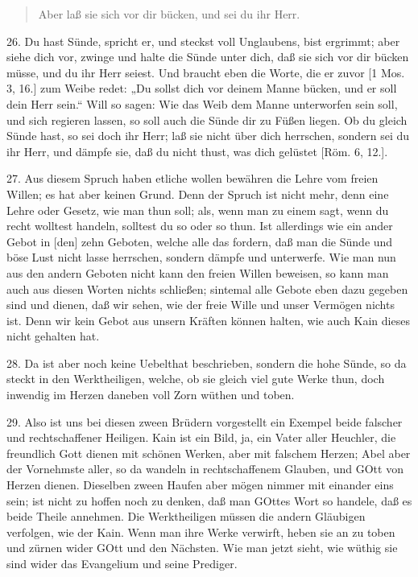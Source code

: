 \begin{quote}
Aber laß sie sich vor dir bücken, und sei du ihr Herr.
\end{quote}

26. Du hast Sünde, spricht er, und steckst voll Unglaubens, bist ergrimmt; aber siehe dich vor, zwinge und halte die Sünde unter dich, daß sie sich vor dir bücken müsse, und du ihr Herr seiest. Und braucht eben die Worte, die er zuvor [1 Mos. 3, 16.] zum Weibe redet: „Du sollst dich vor deinem Manne bücken, und er soll dein Herr sein.“ Will so sagen: Wie das Weib dem Manne unterworfen sein soll, und sich regieren lassen, so soll auch die Sünde dir zu Füßen liegen. Ob du gleich Sünde hast, so sei doch ihr Herr; laß sie nicht über dich herrschen, sondern sei du ihr Herr, und dämpfe sie, daß du nicht thust, was dich gelüstet [Röm. 6, 12.].

27. Aus diesem Spruch haben etliche wollen bewähren die Lehre vom freien Willen; es hat aber keinen Grund. Denn der Spruch ist nicht mehr, denn eine Lehre oder Gesetz, wie man thun soll; als, wenn man zu einem sagt, wenn du recht wolltest handeln, solltest du so oder so thun. Ist allerdings wie ein ander Gebot in [den] zehn Geboten, welche alle das fordern, daß man die Sünde und böse Lust nicht lasse herrschen, sondern dämpfe und unterwerfe. Wie man nun aus den andern Geboten nicht kann den freien Willen beweisen, so kann man auch aus diesen Worten nichts schließen; sintemal alle Gebote eben dazu gegeben sind und dienen, daß wir sehen, wie der freie Wille und unser Vermögen nichts ist. Denn wir kein Gebot aus unsern Kräften können halten, wie auch Kain dieses nicht gehalten hat.

28. Da ist aber noch keine Uebelthat beschrieben, sondern die hohe Sünde, so da steckt in den Werktheiligen, welche, ob sie gleich viel gute Werke thun, doch inwendig im Herzen daneben voll Zorn wüthen und toben.

29. Also ist uns bei diesen zween Brüdern vorgestellt ein Exempel beide falscher und rechtschaffener Heiligen. Kain ist ein Bild, ja, ein Vater aller Heuchler, die freundlich Gott dienen mit schönen Werken, aber mit falschem Herzen; Abel aber der Vornehmste aller, so da wandeln in rechtschaffenem Glauben, und GOtt von Herzen dienen. Dieselben zween Haufen aber mögen nimmer mit einander eins sein; ist nicht zu hoffen noch zu denken, daß man GOttes Wort so handele, daß es beide Theile annehmen. Die Werktheiligen müssen die andern Gläubigen verfolgen, wie der Kain. Wenn man ihre Werke verwirft, heben sie an zu toben und zürnen wider GOtt und den Nächsten. Wie man jetzt sieht, wie wüthig sie sind wider das Evangelium und seine Prediger.

